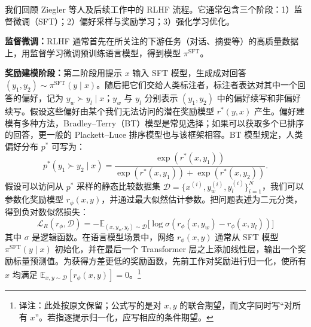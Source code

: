 
我们回顾 Ziegler 等人\cite{dpo-ziegler2020finetuning}及后续工作\cite{dpo-stiennon2022learning,dpo-bai2022training,dpo-ouyang2022training}中的 RLHF 流程。它通常包含三个阶段：1）监督微调（SFT）；2）偏好采样与奖励学习；3）强化学习优化。

\textbf{监督微调：}RLHF 通常首先在所关注的下游任务（对话、摘要等）的高质量数据上，用监督学习微调预训练语言模型，得到模型 $\pi^{\mathrm{SFT}}$。

\textbf{奖励建模阶段：}第二阶段用提示 $x$ 输入 SFT 模型，生成成对回答 $(y_1,y_2)\sim\pi^{\mathrm{SFT}}(y\mid x)$。随后把它们交给人类标注者，标注者表达对其中一个回答的偏好，记为 $y_w\succ y_l\mid x$；$y_w$ 与 $y_l$ 分别表示 $(y_1,y_2)$ 中的偏好续写和非偏好续写。假设这些偏好由某个我们无法访问的潜在奖励模型 $r^*(y,x)$ 产生。偏好建模有多种方法，Bradley--Terry（BT）模型\cite{dpo-bradley1952rankanalysis}是常见选择；如果可以获取多个已排序的回答，更一般的 Plackett--Luce 排序模型\cite{dpo-plackett1975analysis,dpo-luce2012individual}也与该框架相容。BT 模型规定，人类偏好分布 $p^*$ 可写为：
\begin{equation}\label{dpo-eq:bradley-terry}
    p^*(y_1\succ y_2 \mid x)=\frac{\exp\left(r^*(x, y_1)\right)}{\exp\left(r^*(x, y_1)\right) + \exp\left(r^*(x, y_2)\right)}.
\end{equation}
假设可以访问从 $p^*$ 采样的静态比较数据集 $\mathcal D=\bigl\{x^{(i)},y_w^{(i)},y_l^{(i)}\bigr\}_{i=1}^N$，我们可以参数化奖励模型 $r_\phi(x,y)$，并通过最大似然估计参数。把问题表述为二元分类，得到负对数似然损失：
\begin{equation}\label{dpo-eq:reward_model}
    \mathcal{L}_R(r_{\phi}, \mathcal{D}) = -\mathbb{E}_{(x, y_w, y_l)\sim \mathcal{D}}\bigl[\log \sigma(r_{\phi}(x, y_w)- r_{\phi}(x, y_l))\bigr]
\end{equation}
其中 $\sigma$ 是逻辑函数。在语言模型场景中，网络 $r_\phi(x,y)$ 通常从 SFT 模型 $\pi^{\mathrm{SFT}}(y\mid x)$ 初始化，并在最后一个 Transformer 层之上添加线性层，输出一个奖励标量预测值\cite{dpo-ziegler2020finetuning}。为获得方差更低的奖励函数，先前工作对奖励进行归一化，使所有 $x$ 均满足 $\mathbb E_{x,y\sim\mathcal D}[r_\phi(x,y)]=0$。\footnote{译注：此处按原文保留；公式写的是对 $x,y$ 的联合期望，而文字同时写“对所有 $x$”。若指逐提示归一化，应写相应的条件期望。}

